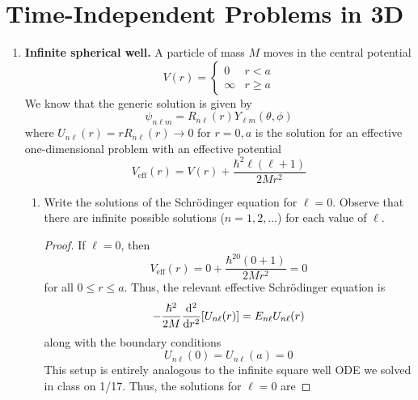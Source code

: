 \documentclass[../psets.tex]{subfiles}
\begin{document}
\section{Time-Independent Problems in 3D}
\begin{enumerate}
    \item {}\textbf{Infinite spherical well.} A particle of mass $M$ moves in the central potential
    \begin{equation}
        V(r) =
        \begin{cases}
            0 & r<a\\
            \infty & r\geq a
        \end{cases}
    \end{equation}
    We know that the generic solution is given by
    \begin{equation}
        \psi_{n\ell m} = R_{n\ell}(r)Y_{\ell m}(\theta,\phi)
    \end{equation}
    where $U_{n\ell}(r)=rR_{n\ell}(r)\to 0$ for $r=0,a$ is the solution for an effective one-dimensional problem with an effective potential
    \begin{equation}
        V_\text{eff}(r) = V(r)+\frac{\hbar^2\ell(\ell+1)}{2Mr^2}
    \end{equation}
    \begin{enumerate}
        \item Write the solutions of the Schr\"{o}dinger equation for $\ell=0$. Observe that there are infinite possible solutions ($n=1,2,\dots$) for each value of $\ell$.
        \begin{proof}
            If $\ell=0$, then 
            \begin{equation*}
                V_\text{eff}(r) = 0+\frac{\hbar^20(0+1)}{2Mr^2}
                = 0
            \end{equation*}
            for all $0\leq r\leq a$. Thus, the relevant effective Schr\"{o}dinger equation is
            \begin{equation*}
                -\frac{\hbar^2}{2M}\dv[2]{r}[U_{n\ell}(r)] = E_{n\ell}U_{n\ell}(r)
            \end{equation*}
            along with the boundary conditions
            \begin{equation*}
                U_{n\ell}(0) = U_{n\ell}(a) = 0
            \end{equation*}
            This setup is entirely analogous to the infinite square well ODE we solved in class on 1/17. Thus, the solutions for $\ell=0$ are

\end{proof}
\end{enumerate}
\end{enumerate}
\end{document}

